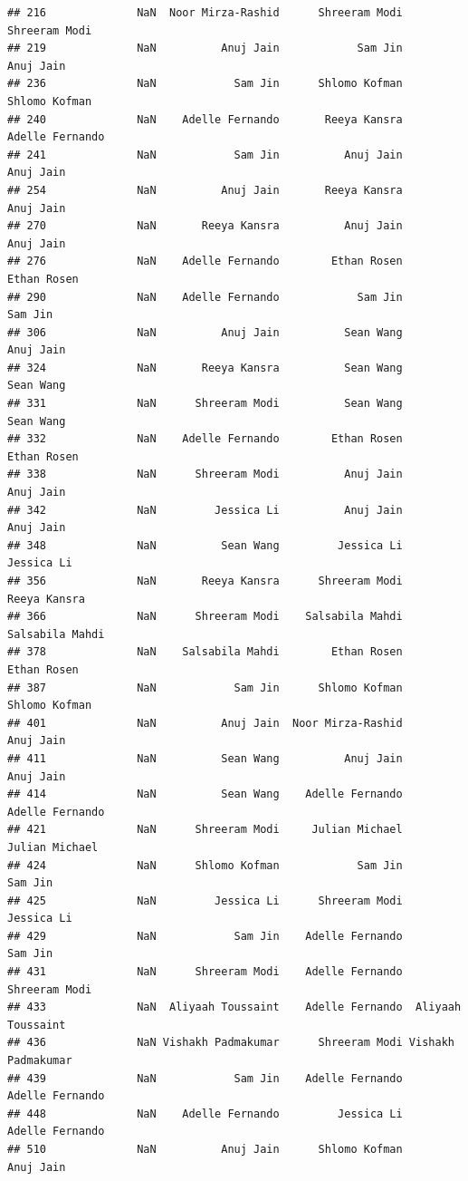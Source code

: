 \documentclass[
]{article}
\begin{document}
\begin{verbatim}
## 216              NaN  Noor Mirza-Rashid      Shreeram Modi      Shreeram Modi
## 219              NaN          Anuj Jain            Sam Jin          Anuj Jain
## 236              NaN            Sam Jin      Shlomo Kofman      Shlomo Kofman
## 240              NaN    Adelle Fernando       Reeya Kansra    Adelle Fernando
## 241              NaN            Sam Jin          Anuj Jain          Anuj Jain
## 254              NaN          Anuj Jain       Reeya Kansra          Anuj Jain
## 270              NaN       Reeya Kansra          Anuj Jain          Anuj Jain
## 276              NaN    Adelle Fernando        Ethan Rosen        Ethan Rosen
## 290              NaN    Adelle Fernando            Sam Jin            Sam Jin
## 306              NaN          Anuj Jain          Sean Wang          Anuj Jain
## 324              NaN       Reeya Kansra          Sean Wang          Sean Wang
## 331              NaN      Shreeram Modi          Sean Wang          Sean Wang
## 332              NaN    Adelle Fernando        Ethan Rosen        Ethan Rosen
## 338              NaN      Shreeram Modi          Anuj Jain          Anuj Jain
## 342              NaN         Jessica Li          Anuj Jain          Anuj Jain
## 348              NaN          Sean Wang         Jessica Li         Jessica Li
## 356              NaN       Reeya Kansra      Shreeram Modi       Reeya Kansra
## 366              NaN      Shreeram Modi    Salsabila Mahdi    Salsabila Mahdi
## 378              NaN    Salsabila Mahdi        Ethan Rosen        Ethan Rosen
## 387              NaN            Sam Jin      Shlomo Kofman      Shlomo Kofman
## 401              NaN          Anuj Jain  Noor Mirza-Rashid          Anuj Jain
## 411              NaN          Sean Wang          Anuj Jain          Anuj Jain
## 414              NaN          Sean Wang    Adelle Fernando    Adelle Fernando
## 421              NaN      Shreeram Modi     Julian Michael     Julian Michael
## 424              NaN      Shlomo Kofman            Sam Jin            Sam Jin
## 425              NaN         Jessica Li      Shreeram Modi         Jessica Li
## 429              NaN            Sam Jin    Adelle Fernando            Sam Jin
## 431              NaN      Shreeram Modi    Adelle Fernando      Shreeram Modi
## 433              NaN  Aliyaah Toussaint    Adelle Fernando  Aliyaah Toussaint
## 436              NaN Vishakh Padmakumar      Shreeram Modi Vishakh Padmakumar
## 439              NaN            Sam Jin    Adelle Fernando    Adelle Fernando
## 448              NaN    Adelle Fernando         Jessica Li    Adelle Fernando
## 510              NaN          Anuj Jain      Shlomo Kofman          Anuj Jain

\end{verbatim}
\end{document}
